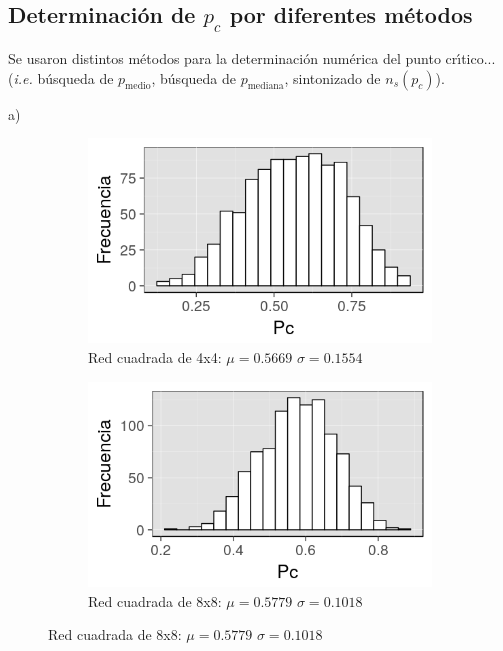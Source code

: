\documentclass[%
 reprint,
 amsmath,amssymb,
 aps,
spanish]{revtex4-1}
\begin{document}
\subsection{\label{p_c} Determinaci\'on de $p_c$ por diferentes m\'etodos}

Se usaron distintos m\'etodos para la determinaci\'on num\'erica del punto cr\'\i tico...(\emph{i.e.} b\'usqueda de $p_\mathrm{medio}$, b\'usqueda de $p_\mathrm{mediana}$, sintonizado de $n_s(p_c)$).

a)

\begin{figure}[h]
\begin{subfigure}{.25\textwidth}
  \centering
  \includegraphics[width=.9\linewidth]{ej1a/hist4x4}
  \caption{Red cuadrada de 4x4: $\mu=0.5669$ $\sigma=0.1554$}
  \label{fig:1a4x4}
\end{subfigure}%
\begin{subfigure}{.25\textwidth}
  \centering
  \includegraphics[width=.9\linewidth]{ej1a/hist8x8}
  \caption{Red cuadrada de 8x8: $\mu=0.5779$ $\sigma=0.1018$}
  \label{fig:1a8x8}
\end{subfigure}

\end{figure}
\end{document}
